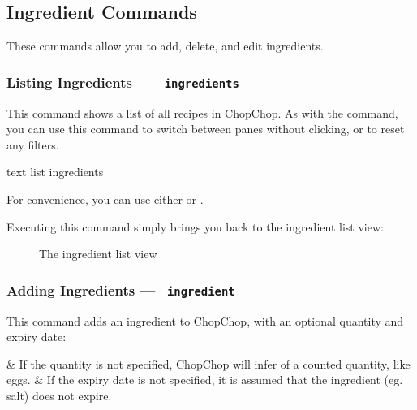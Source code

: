 
\pagebreak
\hypertarget{GroupIngredientCommands}{}
\subsection{Ingredient Commands}

These commands allow you to add, delete, and edit ingredients.

\hypertarget{ListIngredientCommand}{}
\subsubsection{Listing Ingredients — \texttt{ ingredients}}

	This command shows a list of all recipes in ChopChop. As with the  command, you can use this command to switch
	between panes without clicking, or to reset any filters.

	 \begin{blockofcode}{text}
		list ingredients
	\end{blockofcode}

	\begin{infobox}
		\bulb{} \hspace{.6em}\parbox{0.9\textwidth}{%
			 For convenience, you can use either  or .
		}
	\end{infobox}

	Executing this command simply brings you back to the ingredient list view:

	\begin{figure}[!htbp]\centering
		\caption{The ingredient list view}
	\end{figure}



\pagebreak
\hypertarget{AddIngredientCommand}{}
\subsubsection{Adding Ingredients — \texttt{ ingredient}}

	This command adds an ingredient to ChopChop, with an optional quantity and expiry date:
	\begin{bulletlist}
		& If the quantity is not specified, ChopChop will infer  of a counted quantity, like eggs.
		& If the expiry date is not specified, it is assumed that the ingredient (eg. salt) does not expire.
	\end{bulletlist}


